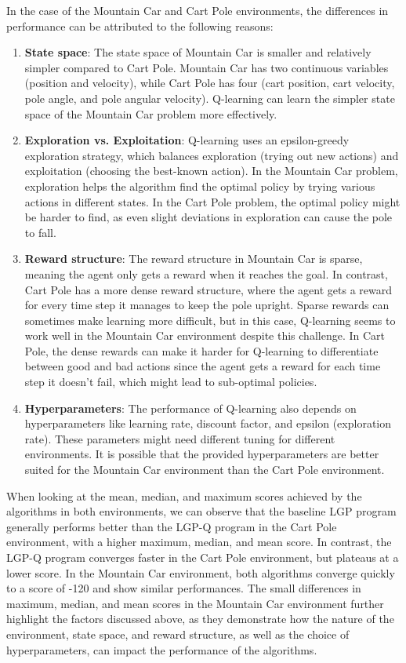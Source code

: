 \documentclass[12pt, final]{dalcsthesis}
\begin{document}
In the case of the Mountain Car and Cart Pole environments, the differences in performance can be attributed to the following reasons:

\begin{enumerate}
	\item \textbf{State space}: The state space of Mountain Car is smaller and relatively simpler compared to Cart Pole. Mountain Car has two continuous variables (position and velocity), while Cart Pole has four (cart position, cart velocity, pole angle, and pole angular velocity). Q-learning can learn the simpler state space of the Mountain Car problem more effectively.

	\item \textbf{Exploration vs. Exploitation}: Q-learning uses an epsilon-greedy exploration strategy, which balances exploration (trying out new actions) and exploitation (choosing the best-known action). In the Mountain Car problem, exploration helps the algorithm find the optimal policy by trying various actions in different states. In the Cart Pole problem, the optimal policy might be harder to find, as even slight deviations in exploration can cause the pole to fall.

	\item \textbf{Reward structure}: The reward structure in Mountain Car is sparse, meaning the agent only gets a reward when it reaches the goal. In contrast, Cart Pole has a more dense reward structure, where the agent gets a reward for every time step it manages to keep the pole upright. Sparse rewards can sometimes make learning more difficult, but in this case, Q-learning seems to work well in the Mountain Car environment despite this challenge. In Cart Pole, the dense rewards can make it harder for Q-learning to differentiate between good and bad actions since the agent gets a reward for each time step it doesn't fail, which might lead to sub-optimal policies.

	\item \textbf{Hyperparameters}: The performance of Q-learning also depends on hyperparameters like learning rate, discount factor, and epsilon (exploration rate). These parameters might need different tuning for different environments. It is possible that the provided hyperparameters are better suited for the Mountain Car environment than the Cart Pole environment.
\end{enumerate}

When looking at the mean, median, and maximum scores achieved by the algorithms in both environments, we can observe that the baseline LGP program generally performs better than the LGP-Q program in the Cart Pole environment, with a higher maximum, median, and mean score. In contrast, the LGP-Q program converges faster in the Cart Pole environment, but plateaus at a lower score. In the Mountain Car environment, both algorithms converge quickly to a score of -120 and show similar performances. The small differences in maximum, median, and mean scores in the Mountain Car environment further highlight the factors discussed above, as they demonstrate how the nature of the environment, state space, and reward structure, as well as the choice of hyperparameters, can impact the performance of the algorithms.
\end{document}
